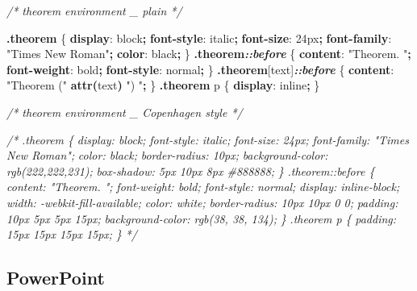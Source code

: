 \documentclass[
]{book}
\newenvironment{Shaded}{\begin{snugshade}}{\end{snugshade}}
\newcommand{\CommentTok}[1]{\textcolor[rgb]{0.56,0.35,0.01}{\textit{#1}}}
\newcommand{\ConstantTok}[1]{\textcolor[rgb]{0.56,0.35,0.01}{#1}}
\newcommand{\DataTypeTok}[1]{\textcolor[rgb]{0.13,0.29,0.53}{#1}}
\newcommand{\DecValTok}[1]{\textcolor[rgb]{0.00,0.00,0.81}{#1}}
\newcommand{\ExtensionTok}[1]{#1}
\newcommand{\FunctionTok}[1]{\textcolor[rgb]{0.13,0.29,0.53}{\textbf{#1}}}
\newcommand{\InformationTok}[1]{\textcolor[rgb]{0.56,0.35,0.01}{\textbf{\textit{#1}}}}
\newcommand{\KeywordTok}[1]{\textcolor[rgb]{0.13,0.29,0.53}{\textbf{#1}}}
\newcommand{\NormalTok}[1]{#1}
\newcommand{\OperatorTok}[1]{\textcolor[rgb]{0.81,0.36,0.00}{\textbf{#1}}}
\newcommand{\StringTok}[1]{\textcolor[rgb]{0.31,0.60,0.02}{#1}}
\theoremstyle{definition}
\theoremstyle{definition}
\theoremstyle{definition}
\theoremstyle{definition}
\theoremstyle{remark}
\begin{document}
\begin{Shaded}
\begin{Highlighting}[]

\CommentTok{/* theorem environment \_ plain */}

\FunctionTok{.theorem}\NormalTok{ \{}
  \KeywordTok{display}\NormalTok{: }\DecValTok{block}\OperatorTok{;}
  \KeywordTok{font{-}style}\NormalTok{: }\DecValTok{italic}\OperatorTok{;}
  \KeywordTok{font{-}size}\NormalTok{: }\DecValTok{24}\DataTypeTok{px}\OperatorTok{;}
  \KeywordTok{font{-}family}\NormalTok{: }\StringTok{"Times New Roman"}\OperatorTok{;}
  \KeywordTok{color}\NormalTok{: }\ConstantTok{black}\OperatorTok{;}
\NormalTok{\}}
\FunctionTok{.theorem}\InformationTok{::before}\NormalTok{ \{}
  \KeywordTok{content}\NormalTok{: }\StringTok{"Theorem. "}\OperatorTok{;}
  \KeywordTok{font{-}weight}\NormalTok{: }\DecValTok{bold}\OperatorTok{;}
  \KeywordTok{font{-}style}\NormalTok{: }\DecValTok{normal}\OperatorTok{;}
\NormalTok{\}}
\FunctionTok{.theorem}\ExtensionTok{[text]}\InformationTok{::before}\NormalTok{ \{}
  \KeywordTok{content}\NormalTok{: }\StringTok{"Theorem ("} \FunctionTok{attr(}\DecValTok{text}\FunctionTok{)} \StringTok{") "}\OperatorTok{;}
\NormalTok{\}}
\FunctionTok{.theorem}\NormalTok{ p \{}
  \KeywordTok{display}\NormalTok{: }\DecValTok{inline}\OperatorTok{;}
\NormalTok{\}}

\CommentTok{/* theorem environment \_ Copenhagen style */}

\CommentTok{/*}
\CommentTok{.theorem \{}
\CommentTok{  display: block;}
\CommentTok{  font{-}style: italic;}
\CommentTok{  font{-}size: 24px;}
\CommentTok{  font{-}family: "Times New Roman";}
\CommentTok{  color: black;}
\CommentTok{  border{-}radius: 10px;}
\CommentTok{  background{-}color: rgb(222,222,231);}
\CommentTok{  box{-}shadow: 5px 10px 8px \#888888;}
\CommentTok{\}}
\CommentTok{.theorem::before \{}
\CommentTok{  content: "Theorem. ";}
\CommentTok{  font{-}weight: bold;}
\CommentTok{  font{-}style: normal;}
\CommentTok{  display: inline{-}block;}
\CommentTok{  width: {-}webkit{-}fill{-}available;}
\CommentTok{  color: white;}
\CommentTok{  border{-}radius: 10px 10px 0 0;}
\CommentTok{  padding: 10px 5px 5px 15px;}
\CommentTok{  background{-}color: rgb(38, 38, 134);}
\CommentTok{\}}
\CommentTok{.theorem p \{}
\CommentTok{  padding: 15px 15px 15px 15px;}
\CommentTok{\}}
\CommentTok{*/}
\end{Highlighting}
\end{Shaded}

\hypertarget{powerpoint}{%
\subsection{PowerPoint}\label{powerpoint}}
\end{document}
